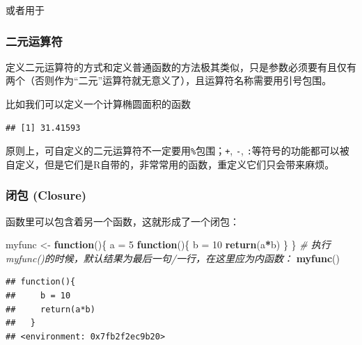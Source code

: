 \documentclass[]{book}
\newenvironment{Shaded}{\begin{snugshade}}{\end{snugshade}}
\newcommand{\CommentTok}[1]{\textcolor[rgb]{0.56,0.35,0.01}{\textit{#1}}}
\newcommand{\ControlFlowTok}[1]{\textcolor[rgb]{0.13,0.29,0.53}{\textbf{#1}}}
\newcommand{\DecValTok}[1]{\textcolor[rgb]{0.00,0.00,0.81}{#1}}
\newcommand{\KeywordTok}[1]{\textcolor[rgb]{0.13,0.29,0.53}{\textbf{#1}}}
\newcommand{\NormalTok}[1]{#1}
\newcommand{\OperatorTok}[1]{\textcolor[rgb]{0.81,0.36,0.00}{\textbf{#1}}}
\newcommand{\StringTok}[1]{\textcolor[rgb]{0.31,0.60,0.02}{#1}}
\begin{document}
或者用于

\hypertarget{binary-operaters}{%
\subsubsection{二元运算符}\label{binary-operaters}}

定义二元运算符的方式和定义普通函数的方法极其类似，只是参数必须要有且仅有两个（否则作为``二元''运算符就无意义了），且运算符名称需要用引号包围。

比如我们可以定义一个计算椭圆面积的函数

\begin{Shaded}
\end{Shaded}

\begin{verbatim}
## [1] 31.41593
\end{verbatim}

原则上，可自定义的二元运算符不一定要用\texttt{\%}包围；\texttt{+}, \texttt{-}, \texttt{:}等符号的功能都可以被自定义，但是它们是R自带的，非常常用的函数，重定义它们只会带来麻烦。

\hypertarget{closure}{%
\subsubsection{闭包 (Closure)}\label{closure}}

函数里可以包含着另一个函数，这就形成了一个闭包：

\begin{Shaded}
\begin{Highlighting}[]
\NormalTok{myfunc <-}\StringTok{ }\ControlFlowTok{function}\NormalTok{()\{}
\NormalTok{  a =}\StringTok{ }\DecValTok{5}
  \ControlFlowTok{function}\NormalTok{()\{}
\NormalTok{    b =}\StringTok{ }\DecValTok{10}
    \KeywordTok{return}\NormalTok{(a}\OperatorTok{*}\NormalTok{b)}
\NormalTok{  \}}
\NormalTok{\}}
\CommentTok{# 执行myfunc()的时候，默认结果为最后一句/一行，在这里应为内函数：}
\KeywordTok{myfunc}\NormalTok{()}
\end{Highlighting}
\end{Shaded}

\begin{verbatim}
## function(){
##     b = 10
##     return(a*b)
##   }
## <environment: 0x7fb2f2ec9b20>
\end{verbatim}
\end{document}
